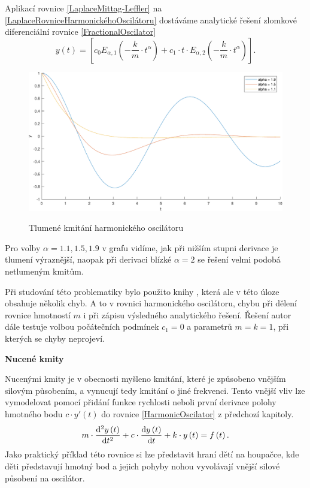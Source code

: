 \documentclass[a4paper,12pt,twoside]{article}
\theoremstyle{definition}
\theoremstyle{remark}
\numberwithin{equation}{section}
\numberwithin{table}{section}
\numberwithin{figure}{section}
\newcommand{\dx}[1]{\mathrm{d} #1}
\begin{document}
Aplikací  rovnice \eqref{LaplaceMittag-Leffler} na \eqref{LaplaceRovniceHarmonickéhoOscilátoru} dostáváme analytické řešení zlomkové diferenciální rovnice \eqref{FractionalOscilator}
\begin{equation}\label{LaplaceMittagLeffler}
	y\left(t\right) = \left[ c_{0} E_{\alpha, 1}\left(-\frac{k}{m}\cdot t^{\alpha}\right) + c_{1}\cdot t \cdot E_{\alpha, 2} \left(-\frac{k}{m}\cdot t ^{\alpha}\right)\right] .
\end{equation}
\begin{figure} [h!]
	\caption{Tlumené kmitání harmonického oscilátoru}
	\includegraphics[width=1\textwidth]{FractionalOscillator_AnalyticalSolution.pdf}
	\label{fig:HarmonicOscilatorAnalytical}
\end{figure}

Pro volby $\alpha = 1.1, 1.5, 1.9$ v grafu vidíme, jak při nižším stupni derivace je tlumení výraznější, naopak při derivaci blízké $\alpha = 2$ se řešení velmi podobá netlumeným kmitům.

Při studování této problematiky bylo použito knihy \cite{ChenInMechanics}, která ale v této úloze obsahuje několik chyb. A to v rovnici harmonického oscilátoru, chybu při dělení rovnice hmotností $m$ i při zápisu výsledného analytického řešení. Řešení autor dále testuje volbou počátečních podmínek $c_{1} = 0$ a parametrů $m = k = 1$, při kterých se chyby neprojeví. %



\medskip
\noindent \textbf{Nucené kmity}

\medskip
\noindent Nucenými kmity je v obecnosti myšleno kmitání, které je způsobeno vnějším silovým působením, a vynucují tedy kmitání o jiné frekvenci.
Tento vnější vliv lze vymodelovat pomocí přidání funkce rychlosti neboli první derivace polohy hmotného bodu $c\cdot y'\left(t\right)$ do rovnice \eqref{HarmonicOscilator} z předchozí kapitoly.
\begin{equation}
	m\cdot \frac{\dx ^{2} y\left(t\right)}{\dx t^{2}} + c\cdot \frac{\dx  y\left(t\right)}{\dx t} +k \cdot y\left(t\right) = f\left(t\right).
\end{equation}
Jako praktický příklad této rovnice si lze představit hraní dětí na houpačce, kde děti představují hmotný bod a jejich pohyby nohou vyvolávají vnější silové působení na oscilátor.
\end{document}

